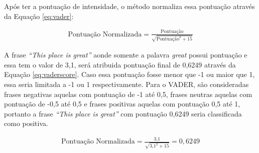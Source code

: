 Após ter a pontuação de intensidade, o método normaliza essa pontuação através
da Equação \ref{eq:vader}:

\begin{equation}
\begin{gathered}
\text{Pontuação Normalizada}
=
\frac{\text{Pontuação}}{\sqrt{\text{Pontuação}^2 + 15}}
\label{eq:vader}
\end{gathered}
\end{equation}

A frase \textit{``This place is great''} aonde somente a palavra
\textit{great} possui pontuação e essa tem o valor de 3,1, será atribuida
pontuação final de 0,6249 através da Equação \ref{eq:vaderscore}.  Caso essa
pontuação fosse menor que -1 ou maior que 1, essa seria limitada a -1 ou 1
respectivamente. Para o \ac{VADER}, são consideradas frases negativas aquelas
com pontuação de -1 até 0,5, frases neutras aquelas com pontuação de -0,5 até
0,5 e frases positivas aquelas com pontuação 0,5 até 1, portanto a frase
\textit{``This place is great''} com pontuação 0,6249 seria classificada como
positiva.

\begin{equation}
\begin{gathered}
\text{Pontuação Normalizada}
=
\frac{\text{3,1}}{\sqrt{\text{3,1}^2 + 15}} = 0,6249
\label{eq:vaderscore}
\end{gathered}
\end{equation}